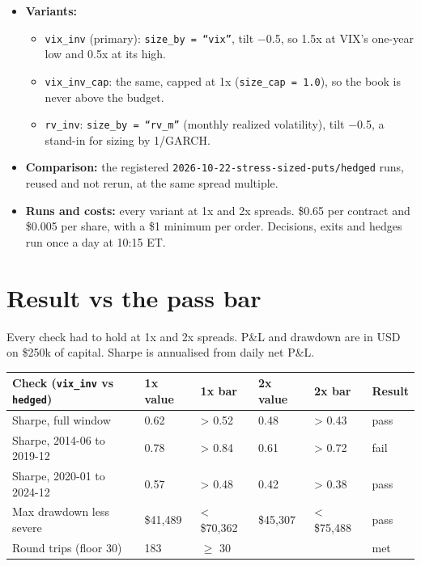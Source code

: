 \documentclass{article}
\begin{document}
\begin{itemize}
\item \textbf{Variants:}

\begin{itemize}

\item \texttt{vix\_\allowbreak{}inv} (primary): \texttt{size\_\allowbreak{}by = ``vix''}, tilt \ensuremath{-}0.5, so 1.5x at VIX's one-year low and 0.5x at its high.

\item \texttt{vix\_\allowbreak{}inv\_\allowbreak{}cap}: the same, capped at 1x (\texttt{size\_\allowbreak{}cap = 1.\allowbreak{}0}), so the book is never above the budget.

\item \texttt{rv\_\allowbreak{}inv}: \texttt{size\_\allowbreak{}by = ``rv\_\allowbreak{}m''} (monthly realized volatility), tilt \ensuremath{-}0.5, a stand-in for sizing by 1/\allowbreak{}GARCH.

\end{itemize}

\item \textbf{Comparison:} the registered \texttt{2026-\allowbreak{}10-\allowbreak{}22-\allowbreak{}stress-\allowbreak{}sized-\allowbreak{}puts/\allowbreak{}hedged} runs, reused and not rerun, at the same spread multiple.

\item \textbf{Runs and costs:} every variant at 1x and 2x spreads. \$0.65 per contract and \$0.005 per share, with a \$1 minimum per order. Decisions, exits and hedges run once a day at 10:15 ET.

\end{itemize}

\section{Result vs the pass bar}

Every check had to hold at 1x and 2x spreads. P\&L and drawdown are in USD on \$250k of capital. Sharpe is annualised from daily net P\&L.

\begin{center}\small
\begin{tabularx}{\linewidth}{>{\raggedright\arraybackslash}X l l l l l}
\toprule
\textbf{Check (\texttt{vix\_\allowbreak{}inv} vs \texttt{hedged})} & \textbf{1x value} & \textbf{1x bar} & \textbf{2x value} & \textbf{2x bar} & \textbf{Result} \\
\midrule
Sharpe, full window & 0.62 & > 0.52 & 0.48 & > 0.43 & pass \\
Sharpe, 2014-06 to 2019-12 & 0.78 & > 0.84 & 0.61 & > 0.72 & fail \\
Sharpe, 2020-01 to 2024-12 & 0.57 & > 0.48 & 0.42 & > 0.38 & pass \\
Max drawdown less severe & \$41,489 & < \$70,362 & \$45,307 & < \$75,488 & pass \\
Round trips (floor 30) & 183 & \ensuremath{\geq} 30 &  &  & met \\
\bottomrule
\end{tabularx}
\end{center}
\end{document}
